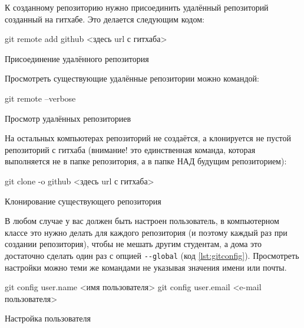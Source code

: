 \documentclass[12pt]{article}
\begin{document}
К созданному репозиторию нужно присоединить удалённый репозиторий созданный на гитхабе. Это делается следующим кодом:
\begin{listing}[H]
\begin{center}
\begin{bashcode}
git remote add github <здесь url с гитхаба>
\end{bashcode}
\end{center}
\caption{Присоединение удалённого репозитория}
\label{lst:gitremote}
\end{listing}

Просмотреть существующие удалённые репозитории можно командой: 
\begin{listing}[H]
\begin{center}
\begin{bashcode}
git remote --verbose
\end{bashcode}
\end{center}
\caption{Просмотр удалённых репозиториев}
\label{lst:gitremotelist}
\end{listing}

На остальных компьютерах репозиторий не создаётся, а клонируется не пустой репозиторий с гитхаба (внимание! это единственная команда, которая выполняется не в папке репозитория, а в папке НАД будущим репозиторием):
\begin{listing}[H]
\begin{center}
\begin{bashcode}
git clone -o github <здесь url с гитхаба>
\end{bashcode}
\end{center}
\caption{Клонирование существующего репозитория}
\label{lst:gitclone}
\end{listing}

В любом случае у вас должен быть настроен пользователь, в компьютерном классе это нужно делать для каждого репозитория (и поэтому каждый раз при создании репозитория), чтобы не мешать другим студентам, а дома это достаточно сделать один раз с опцией \verb|--global| (код \ref{lst:gitconfig}). Просмотреть настройки можно теми же командами не указывая значения имени или почты.
\begin{listing}[H]
\begin{center}
\begin{bashcode}
git config user.name <имя пользователя>
git config user.email <e-mail пользователя>
\end{bashcode}
\end{center}
\caption{Настройка пользователя}
\label{lst:gitconfig}
\end{listing}
\end{document}
